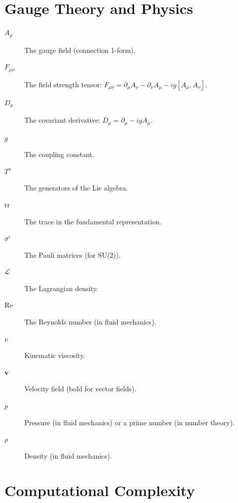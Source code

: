 \section{Gauge Theory and Physics}

\begin{description}
  \item[$A_\mu$] The gauge field (connection 1-form).
  \item[$F_{\mu\nu}$] The field strength tensor: $F_{\mu\nu} = \partial_\mu A_\nu - \partial_\nu A_\mu - ig[A_\mu, A_\nu]$.
  \item[$D_\mu$] The covariant derivative: $D_\mu = \partial_\mu - igA_\mu$.
  \item[$g$] The coupling constant.
  \item[$T^a$] The generators of the Lie algebra.
  \item[$\mathrm{tr}$] The trace in the fundamental representation.
  \item[$\sigma^i$] The Pauli matrices (for SU(2)).
  \item[$\mathcal{L}$] The Lagrangian density.
  \item[$\mathrm{Re}$] The Reynolds number (in fluid mechanics).
  \item[$\nu$] Kinematic viscosity.
  \item[$\mathbf{v}$] Velocity field (bold for vector fields).
  \item[$p$] Pressure (in fluid mechanics) or a prime number (in number theory).
  \item[$\rho$] Density (in fluid mechanics).
\end{description}

\section{Computational Complexity}

